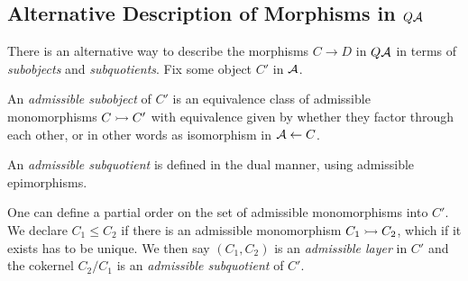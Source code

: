 \subsection{Alternative Description of Morphisms in $Q\mathcal{A}$}
There is an alternative way to describe the morphisms $C \to D$ in $Q\mathcal{A}$
in terms of \emph{subobjects} and \emph{subquotients}. Fix some object $C'$ in $\mathcal{A}$.

\begin{definition}
An \emph{admissible subobject} of $C'$ is an equivalence class of admissible monomorphisms
$C \rightarrowtail C'$ with equivalence given by whether they factor through each other,
or in other words as isomorphism in $\mathcal{A} \leftarrow C$.

An \emph{admissible subquotient} is defined in the dual manner, using admissible epimorphisms.
\end{definition}

One can define a partial order on the set of admissible monomorphisms into $C'$.
We declare $C_1 \leq C_2$ if there is an admissible monomorphism $C_1 \rightarrowtail C_2$, which if it exists
has to be unique.
We then say $(C_1, C_2)$ is an \emph{admissible layer} in $C'$ and the cokernel $C_2/C_1$ is an \emph{admissible subquotient} of $C'$.

